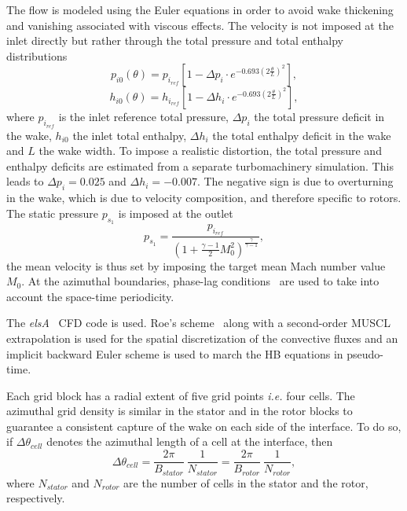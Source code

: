 The flow is modeled using the 
Euler equations in order to avoid wake thickening and vanishing
associated with viscous effects. 
The velocity is not imposed at the inlet directly
but rather through the total pressure and total enthalpy distributions
\begin{equation}
  \label{eq:rotatingblocks_ptot}
    p_{i0} (\theta) = p_{i_{ref}} \left[1 - 
        \Delta p_i \cdot e^{
          -0.693 \left( 2 \frac{\theta}{L} \right) ^ 2}\right],
\end{equation}
\begin{equation}
  \label{eq:rotatingblocks_htot}
    h_{i0} (\theta) = h_{i_{ref}} \left[1- 
        \Delta h_i \cdot e^{
          -0.693 \left( 2 \frac{\theta}{L} \right) ^ 2}\right],
\end{equation}
where $p_{i_{ref}}$ is the inlet reference total pressure, $\Delta p_i$ the total pressure
deficit in the wake,
$h_{i0}$ the inlet total enthalpy, $\Delta h_i$ the total enthalpy
deficit in the wake and $L$ the wake width.
To impose a realistic distortion, the total pressure and
enthalpy deficits are estimated from a separate turbomachinery simulation.
This leads to $\Delta p_i = 0.025$ and 
$\Delta h_i = - 0.007$.
The negative sign is due to overturning in the wake, which
is due to velocity composition, and therefore specific to rotors.
The static pressure $p_{s_1}$ is imposed at the outlet
\begin{equation}
    p_{s_1} = \frac{p_{i_{ref}}}{\left(1 + 
    \frac{\gamma - 1}{2} M_{0}^2 \right) ^ {\frac{\gamma}{ \gamma - 1}}} ,
\end{equation}
the mean velocity is thus set by imposing the
target mean Mach number value $M_{0}$.
At the azimuthal boundaries, phase-lag conditions~\cite{Erdos1977} 
are used to take into account the space-time periodicity.

The \textit{elsA}~\cite{Cambier2013} CFD code is used.
Roe's scheme~\cite{Roe1981} along with a second-order MUSCL extrapolation 
is used for the spatial discretization of
the convective fluxes and an implicit backward Euler scheme is used
to march the HB equations in pseudo-time.

Each grid block has a radial extent of five grid points \emph{i.e.} four cells. 
The azimuthal grid density is similar in the stator and in the rotor blocks
to guarantee a consistent capture of the wake on each side of the interface.
To do so, if $\Delta \theta_{cell}$ denotes the azimuthal length of a cell
at the interface, then
\begin{equation}
   \Delta \theta_{cell} = \frac{2\pi}{B_{stator}}~\frac{1}{N_{stator}}
   = \frac{2\pi}{B_{rotor}}~\frac{1}{N_{rotor}},
   \label{eq:az_spatial_discretization_1}
\end{equation}
where $N_{stator}$ and $N_{rotor}$ are the number of cells
in the stator and the rotor, respectively. 

